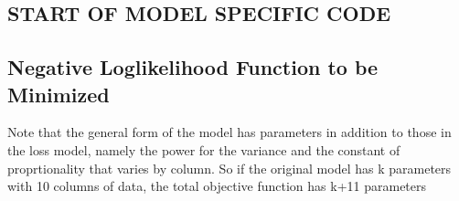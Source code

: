 \documentclass[]{article}
\newenvironment{Shaded}{\begin{snugshade}}{\end{snugshade}}
\newcommand{\ControlFlowTok}[1]{\textcolor[rgb]{0.13,0.29,0.53}{\textbf{#1}}}
\newcommand{\KeywordTok}[1]{\textcolor[rgb]{0.13,0.29,0.53}{\textbf{#1}}}
\newcommand{\NormalTok}[1]{#1}
\newcommand{\OperatorTok}[1]{\textcolor[rgb]{0.81,0.36,0.00}{\textbf{#1}}}
\newcommand{\StringTok}[1]{\textcolor[rgb]{0.31,0.60,0.02}{#1}}
\begin{document}
\hypertarget{start-of-model-specific-code}{%
\subsection{START OF MODEL SPECIFIC
CODE}\label{start-of-model-specific-code}}

\begin{Shaded}
\end{Shaded}

\hypertarget{negative-loglikelihood-function-to-be-minimized}{%
\subsection{Negative Loglikelihood Function to be
Minimized}\label{negative-loglikelihood-function-to-be-minimized}}

Note that the general form of the model has parameters in addition to
those in the loss model, namely the power for the variance and the
constant of proprtionality that varies by column. So if the original
model has k parameters with 10 columns of data, the total objective
function has k+11 parameters
\end{document}
